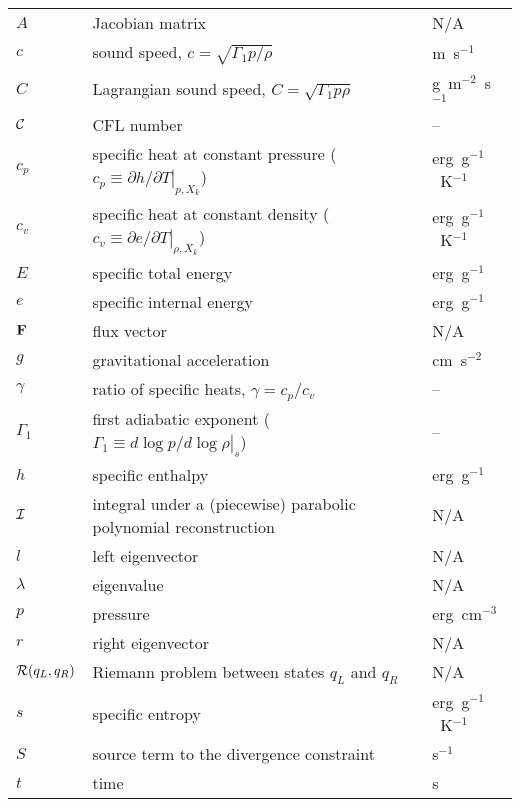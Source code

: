 \begin{center}
\begin{longtable}{|l|p{4.0in}|l|}
\hline 
\endlastfoot
$A$     & Jacobian matrix  & N/A \\
%
$c$     & sound speed, $c = \sqrt{\Gamma_1 p/\rho}$  & m~s$^{-1}$ \\
%
$C$       & Lagrangian sound speed, $C = \sqrt{\Gamma_1 p \rho}$ & g~m$^{-2}$~s$^{-1}$\\
%
${\mathcal{C}}$    & CFL number & --\\
%
$c_p$   & specific heat at constant pressure
          ($c_p \equiv \left . \partial h / \partial T \right |_{p,X_k}$)
        & erg~g$^{-1}$~K$^{-1}$ \\
%
$c_v$   & specific heat at constant density
          ($c_v \equiv \left . \partial e / \partial T \right |_{\rho,X_k}$)
        & erg~g$^{-1}$~K$^{-1}$ \\
%
$E$     & specific total energy                      & erg~g$^{-1}$ \\
%
$e$     & specific internal energy                   & erg~g$^{-1}$ \\
%
${\bf F}$     & flux vector                                & N/A \\
%
$g$     & gravitational acceleration                 & cm~s$^{-2}$ \\
%
$\gamma$ & ratio of specific heats, $\gamma = c_p/c_v$ & -- \\
%
$\Gamma_1$ & first adiabatic exponent ($\Gamma_1 \equiv \left . d \log p/d \log \rho \right |_s$) & -- \\
%
$h$     & specific enthalpy                          & erg~g$^{-1}$ \\
%
${\mathcal{I}}$   & integral under a (piecewise) parabolic polynomial reconstruction & N/A \\
%
$l$     & left eigenvector                           & N/A \\
%
$\lambda$ & eigenvalue                               & N/A \\
% 
$p$     & pressure                                   & erg~cm$^{-3}$ \\
%
$r$     & right eigenvector                          & N/A \\
%
${\mathcal{R}}(q_L, q_R)$ & Riemann problem between states $q_L$ and $q_R$ & N/A \\
%
$s$     & specific entropy                           & erg~g$^{-1}$~K$^{-1}$ \\
%
$S$     & source term to the divergence constraint   & s$^{-1}$ \\
%
$t$     & time                                       & s \\

\end{longtable}
\end{center}
